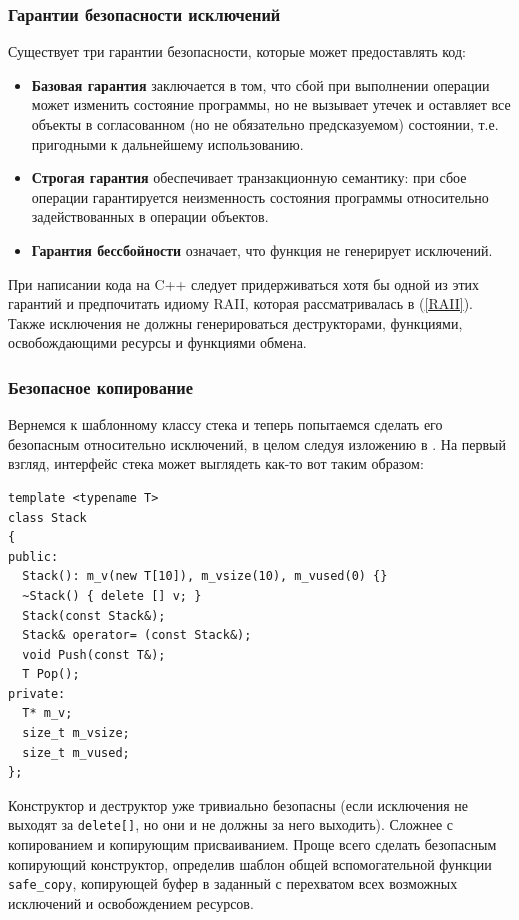 \documentclass[a4paper,12pt,oneside]{article}
\begin{document}
\subsubsection{Гарантии безопасности исключений}\label{SafetyGuarantees}

Существует три гарантии безопасности, которые может предоставлять код:

\begin{itemize}
\item
\textbf{Базовая гарантия} заключается в том, что сбой при выполнении операции может изменить состояние программы, но не вызывает утечек и оставляет все объекты в согласованном (но не обязательно предсказуемом) состоянии, т.е. пригодными к дальнейшему использованию.
\item
\textbf{Строгая гарантия} обеспечивает транзакционную семантику: при сбое операции гарантируется неизменность состояния программы относительно задействованных в операции объектов.
\item
\textbf{Гарантия бессбойности} означает, что функция не генерирует исключений.
\end{itemize}

При написании кода на C++ следует придерживаться хотя бы одной из этих гарантий и предпочитать идиому RAII, которая рассматривалась в (\ref{RAII}). Также исключения не должны генерироваться деструкторами, функциями, освобождающими ресурсы и функциями обмена.

\subsubsection{Безопасное копирование}\label{SafeCopying}

Вернемся к шаблонному классу стека и теперь попытаемся сделать его безопасным относительно исключений, в целом следуя изложению в \cite{exceptionalcpp}. На первый взгляд, интерфейс стека может выглядеть как-то вот таким образом:

\begin{lstlisting}
template <typename T> 
class Stack
{
public:
  Stack(): m_v(new T[10]), m_vsize(10), m_vused(0) {}
  ~Stack() { delete [] v; }
  Stack(const Stack&);
  Stack& operator= (const Stack&);
  void Push(const T&);
  T Pop();
private:
  T* m_v;
  size_t m_vsize;
  size_t m_vused;
};
\end{lstlisting}

Конструктор и деструктор уже тривиально безопасны (если исключения не выходят за \lstinline!delete[]!, но они и не должны за него выходить). Сложнее с копированием и копирующим присваиванием. Проще всего сделать безопасным копирующий конструктор, определив шаблон общей вспомогательной функции \lstinline!safe_copy!, копирующей буфер в заданный с перехватом всех возможных исключений и освобождением ресурсов.
\end{document}
